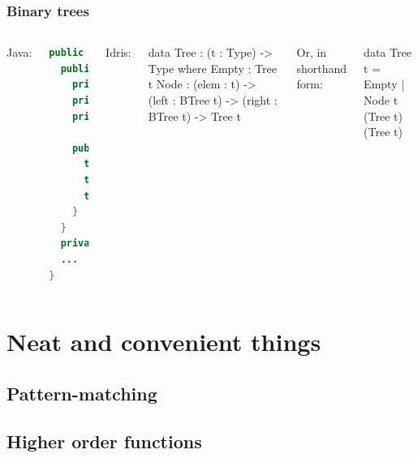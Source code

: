 \documentclass{beamer}
\begin{document}
  \begin{frame}[fragile]
    \frametitle{Binary trees}

    \begin{columns}
      Java:
      {\scriptsize
      \begin{lstlisting}[language=java]
public class Tree<T> {
  public static class Node<T> {
    private T content;
    private Node<T> left;
    private Node<T> right;

    public Node(T elem) {
      this.elem = elem;
      this.right = null;
      this.left = null;
    }
  }
  private Node<T> root;
  ...
}
      \end{lstlisting}
      }

      Idris:

      \begin{idrislisting}[basicstyle=\ttfamily\scriptsize]
data Tree : (t : Type) -> Type where
  Empty : Tree t
  Node  : (elem : t) ->
          (left : BTree t) ->
          (right : BTree t) ->
          Tree t
      \end{idrislisting}

      \vspace*{1mm}

      {\footnotesize Or, in shorthand form:}

      \vspace*{-2mm}

      \begin{idrislisting}[basicstyle=\ttfamily\scriptsize]
data Tree t
  = Empty
  | Node t (Tree t) (Tree t)
      \end{idrislisting}
    \end{columns}

\end{frame}


\section{Neat and convenient things}
  \subsection{Pattern-matching}

  \subsection{Higher order functions}
\end{document}
